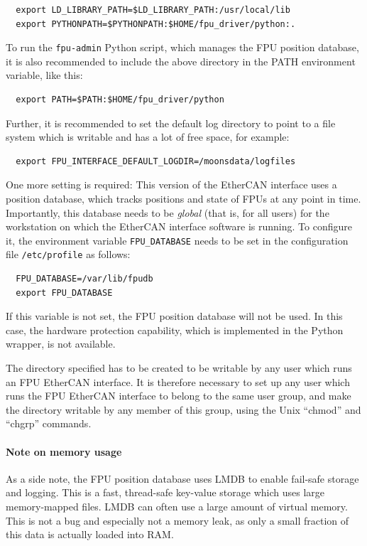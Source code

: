 \documentclass[fontsize=12,a4paper]{scrreprt}
\begin{document}
\begin{verbatim}
  export LD_LIBRARY_PATH=$LD_LIBRARY_PATH:/usr/local/lib
  export PYTHONPATH=$PYTHONPATH:$HOME/fpu_driver/python:.
\end{verbatim}

To run the \texttt{fpu-admin} Python script, which manages the FPU
position database, it is also recommended to include the above
directory in the PATH environment variable, like this:

\begin{verbatim}
  export PATH=$PATH:$HOME/fpu_driver/python
\end{verbatim}


Further, it is recommended to set the default log directory to point
to a file system which is writable and has a lot of free space, for
example:
\begin{verbatim}
  export FPU_INTERFACE_DEFAULT_LOGDIR=/moonsdata/logfiles
\end{verbatim}

%
One more setting is required: This version of the EtherCAN interface
uses a position database, which tracks positions and state of FPUs at
any point in time. Importantly, this database needs to be
\emph{global} (that is, for all users) for the workstation on which
the EtherCAN interface software is running. To configure it, the
environment variable \texttt{FPU\_DATABASE} needs to be set in the
configuration file \texttt{/etc/profile} as follows:

%
\begin{verbatim}
  FPU_DATABASE=/var/lib/fpudb
  export FPU_DATABASE
\end{verbatim}

If this variable is not set, the FPU position database will not be
used. In this case, the hardware protection capability, which is
implemented in the Python wrapper, is not available.

The directory specified has to be created to be writable by any user
which runs an FPU EtherCAN interface. It is therefore necessary to set up any user
which runs the FPU EtherCAN interface to belong to the same user group, and make
the directory writable by any member of this group, using the Unix
``chmod'' and ``chgrp'' commands.

\paragraph{Note on memory usage}
%
%
%
As a side note, the FPU position database uses LMDB to enable
fail-safe storage and logging. This is a fast, thread-safe key-value
storage which uses large memory-mapped files.  LMDB can often use a
large amount of virtual memory. This is not a bug and especially not a
memory leak, as only a small fraction of this data is actually loaded
into RAM.
\end{document}
